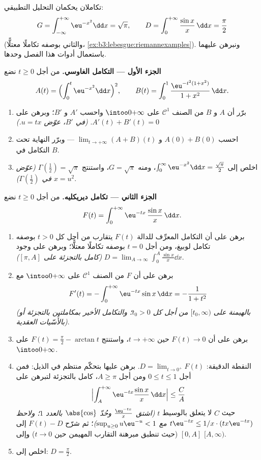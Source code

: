 \begin{problem}
\label{pb:b3:lebesgue:1}
تكاملان يحكمان التحليل التطبيقي:
\[
G = \int_{-\infty}^{+\infty}\eu^{-x^2}\dd x = \sqrt\pi,
\qquad
D = \int_0^{+\infty}\frac{\sin x}{x}\,\dd x = \frac\pi2
\]
(والثاني بوصفه تكاملًا معتلًّا، \cref{ex:b3:lebesgue:riemannexamples}). ونبرهن عليهما
باستعمال أدوات هذا الفصل وحدها.

\medskip
\noindent\textbf{الجزء الأول --- التكامل الغاوسي.} من أجل
$t \geq 0$ نضع
\[
A(t) = \Bigl(\int_0^t\eu^{-x^2}\dd x\Bigr)^{2},
\qquad
B(t) = \int_0^1\frac{\eu^{-t^2(1 + x^2)}}{1 + x^2}\,\dd x .
\]
\begin{enumerate}
  \item برّر أن $A$ و $B$ من الصنف $\mathcal C^1$ على $\intoo0{+\infty}$
        واحسب $A'$ و $B'$؛ وبرهن على $A'(t) + B'(t) = 0$. \emph{(في $B'$،
        عوّض $u =
        tx$.)}
  \item احسب $A(0) + B(0)$ و $\lim_{t\to+\infty}(A + B)(t)$ --- وبرّر النهاية تحت
        التكامل في $B$.
  \item اخلص إلى $\int_0^\infty \eu^{-x^2}\dd x =
        \frac{\sqrt\pi}2$، ومنه $G = \sqrt\pi$، واستنتج $\Gamma(\tfrac12) = \sqrt\pi$
        \emph{(عوّض $x =
        u^2$ في $\Gamma(\frac12)$)}.
\end{enumerate}

\medskip
\noindent\textbf{الجزء الثاني --- تكامل ديريكليه.} من أجل
$t
\geq 0$ نضع
\[
F(t) = \int_0^{+\infty}\eu^{-tx}\,\frac{\sin x}{x}\,\dd x .
\]
\begin{enumerate}[resume]
  \item برهن على أن التكامل المعرِّف للدالة $F(t)$ يتقارب من أجل كل
        $t > 0$ بوصفه تكامل لوبيغ، ومن أجل $t = 0$ بوصفه تكاملًا
        معتلًّا؛ وبرهن على وجود $D =
        \lim_{A\to\infty}\int_0^A\frac{\sin x}x\dd x$ \emph{(كامل بالتجزئة على
        $[\pi, A]$)}.
  \item برهن على أن $F$ من الصنف $\mathcal C^1$ على $\intoo0{+\infty}$ مع
        \[
        F'(t) = -\int_0^{+\infty}\eu^{-tx}\sin x\,\dd x
        = -\frac{1}{1 + t^2}
        \]
        \emph{(بالهيمنة على $[t_0, \infty)$ من أجل كل $t_0 >
        0$؛
        والتكامل الأخير بمكاملتين بالتجزئة أو بالأُسّيات
        العقدية)}.
  \item برهن على أن $F(t) \to 0$ حين $t \to +\infty$، واستنتج
        $F(t)
        = \frac\pi2 - \arctan t$ على $\intoo0{+\infty}$.
  \item النقطة الدقيقة: $D = \lim_{t\to0^+}F(t)$. برهن عليها بتحكّم منتظم في
        الذيل: فمن أجل $0 \leq t \leq 1$ ومن أجل $A \geq \pi$، كامل
        بالتجزئة لتبرهن على
        \[
        \Bigl|\int_A^{+\infty}\eu^{-tx}\frac{\sin
        x}x\,\dd x\Bigr| \leq \frac{C}{A}
        \]
        حيث $C$ لا يتعلق بالوسيط $t$ \emph{(اشتق $\frac{\eu^{-tx}}x$ وحُدّ
        $\abs{\cos}$ بالعدد $1$؛ ولاحظ $t\eu^{-tx} \leq 1/x\cdot(tx\eu^{-tx})$ مع $\sup_{u\geq0}u\eu^{-u} < 1$)}؛ ثم
        شرّح $F(t) - D$ إلى $[0, A]$ (حيث تنطبق مبرهنة التقارب
        المهيمن حين $t \to 0$) وإلى $[A, \infty)$.
  \item اخلص إلى: $D = \frac\pi2$.
\end{enumerate}


\end{problem}
